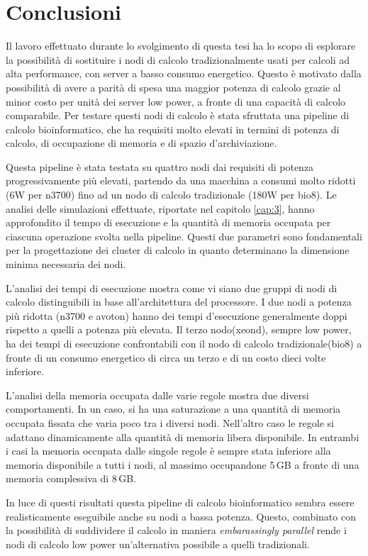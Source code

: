 \chapter{Conclusioni}
Il lavoro effettuato durante lo svolgimento di questa tesi ha lo scopo di esplorare la possibilità di sostituire i nodi di calcolo tradizionalmente usati per calcoli ad alta performance, con server a basso consumo energetico.
Questo è motivato dalla possibilità di avere a parità di spesa una maggior potenza di calcolo grazie al minor costo per unità dei server low power, a fronte di una capacità di calcolo comparabile.
Per testare questi nodi di calcolo è stata sfruttata una pipeline di calcolo bioinformatico, che ha requisiti molto elevati in termini di potenza di calcolo, di occupazione di memoria e di spazio d'archiviazione.

Questa pipeline è stata testata su quattro nodi dai requisiti di potenza progressivamente più elevati, partendo da una macchina a consumi molto ridotti (6W per n3700) fino ad un nodo di calcolo tradizionale (180W per bio8).
Le analisi delle simulazioni effettuate, riportate nel capitolo \ref{cap:3}, hanno approfondito il tempo di esecuzione e la quantità di memoria occupata per ciascuna operazione svolta nella pipeline.
Questi due parametri sono fondamentali per la progettazione dei cluster di calcolo in quanto determinano la dimensione minima necessaria dei nodi.

L'analisi dei tempi di esecuzione mostra come vi siano due gruppi di nodi di calcolo distinguibili in base all'architettura del processore.
I due nodi a potenza più ridotta (n3700 e avoton) hanno dei tempi d'esecuzione generalmente doppi rispetto a quelli a potenza più elevata.
Il terzo nodo(xeond), sempre low power, ha dei tempi di esecuzione confrontabili con il nodo di calcolo tradizionale(bio8) a fronte di un consumo energetico di circa un terzo e di un costo dieci volte inferiore.

L'analisi della memoria occupata dalle varie regole mostra due diversi comportamenti.
In un caso, si ha una saturazione a una quantità di memoria occupata fissata che varia poco tra i diversi nodi.
Nell'altro caso le regole si adattano dinamicamente alla quantità di memoria libera disponibile.
In entrambi i casi la memoria occupata dalle singole regole è sempre stata inferiore alla memoria disponibile a tutti i nodi, al massimo occupandone 5\,GB a fronte di una memoria complessiva di 8\,GB.

In luce di questi risultati questa pipeline di calcolo bioinformatico sembra essere realisticamente eseguibile anche su nodi a bassa potenza.
Questo, combinato con la possibilità di suddividere il calcolo in maniera \textit{embarassingly parallel} rende i nodi di calcolo low power un'alternativa possibile a quelli tradizionali. 

